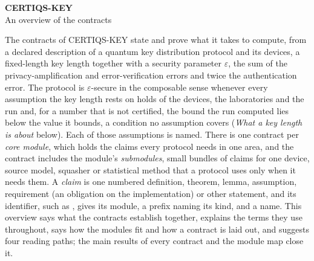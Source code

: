 
\setlength{\emergencystretch}{2em}

\begin{center}
{\LARGE\bfseries CERTIQS-KEY}\\[4pt]
{\large An overview of the contracts}
\end{center}

\noindent The contracts of CERTIQS-KEY state and prove what it takes to
compute, from a declared description of a quantum key distribution protocol
and its devices, a fixed-length key length together with a security
parameter $\varepsilon$, the sum of the privacy-amplification and
error-verification errors and twice the authentication error. The protocol
is $\varepsilon$-secure in the composable sense whenever every assumption the
key length rests on holds of the devices, the laboratories and the run and,
for a number that is not certified, the bound the run computed lies below the
value it bounds, a condition no assumption covers (\emph{What a key length is
about} below). Each of those assumptions is named. There
is one contract per \emph{core module}, which holds the claims every protocol
needs in one area, and the contract includes the module's
\emph{submodules}, small bundles of claims for one device, source model,
squasher or statistical method that a protocol uses only when it needs them.
A \emph{claim} is one numbered definition, theorem, lemma, assumption,
requirement (an obligation on the implementation) or other statement, and
its identifier, such as , gives its module,
a prefix naming its kind, and a name. This overview says what the contracts
establish together, explains the terms they use throughout, says how the
modules fit and how a contract is laid out, and suggests four reading paths;
the main results of every contract and the module map close it.

